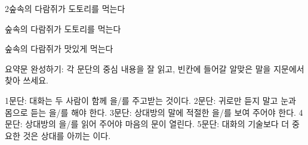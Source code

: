 \documentclass[fs12,seriesSau]{korfarm-base}
\begin{document}
\begin{kfSentenceUnit}{2}{숲속의 다람쥐가 도토리를 먹는다}
\begin{kfChoices}
\kfChoice 숲속의
\kfChoice 다람쥐가
\kfChoice 도토리를
\kfChoice 먹는다
\end{kfChoices}
\begin{kfChoices}
\kfChoice 숲속의
\kfChoice 다람쥐가
\kfChoice 맛있게
\kfChoice 먹는다
\end{kfChoices}
\end{kfSentenceUnit}

\kfActivityBg {}
\par{}\par\nopagebreak[4]\smallskip\nopagebreak[4]

\kfActivityBg \par{}\par\nopagebreak[4]\smallskip\nopagebreak[4]
\begin{kfBlankList}
\kfBlankItem 요약문 완성하기: 각 문단의 중심 내용을 잘 읽고, 빈칸에 들어갈 알맞은 말을 지문에서 찾아 쓰세요.

1문단: 대화는 두 사람이 함께 \kfFillBlank[42mm]{}을/를 주고받는 것이다. 2문단: 귀로만 듣지 말고 눈과 몸으로 듣는 \kfFillBlank[42mm]{}을/를 해야 한다. 3문단: 상대방의 말에 적절한 \kfFillBlank[42mm]{}을/를 보여 주어야 한다. 4문단: 상대방의 \kfFillBlank[42mm]{}을/를 읽어 주어야 마음의 문이 열린다. 5문단: 대화의 기술보다 더 중요한 것은 상대를 아끼는 \kfFillBlank[42mm]{}이다.
\end{kfBlankList}

\kfActivityBg \par{}\par\nopagebreak[4]\smallskip\nopagebreak[4]

\end{document}
